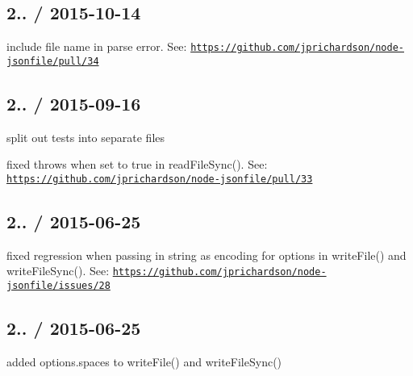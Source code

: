 \subsection*{2.. / 2015-\/10-\/14 }


\begin{DoxyItemize}
\item include file name in parse error. See\+: \href{https://github.com/jprichardson/node-jsonfile/pull/34}{\tt https\+://github.\+com/jprichardson/node-\/jsonfile/pull/34}
\end{DoxyItemize}

\subsection*{2.. / 2015-\/09-\/16 }


\begin{DoxyItemize}
\item split out tests into separate files
\item fixed {\ttfamily throws} when set to {\ttfamily true} in {\ttfamily read\+File\+Sync()}. See\+: \href{https://github.com/jprichardson/node-jsonfile/pull/33}{\tt https\+://github.\+com/jprichardson/node-\/jsonfile/pull/33}
\end{DoxyItemize}

\subsection*{2.. / 2015-\/06-\/25 }


\begin{DoxyItemize}
\item fixed regression when passing in string as encoding for options in {\ttfamily write\+File()} and {\ttfamily write\+File\+Sync()}. See\+: \href{https://github.com/jprichardson/node-jsonfile/issues/28}{\tt https\+://github.\+com/jprichardson/node-\/jsonfile/issues/28}
\end{DoxyItemize}

\subsection*{2.. / 2015-\/06-\/25 }


\begin{DoxyItemize}
\item added {\ttfamily options.\+spaces} to {\ttfamily write\+File()} and {\ttfamily write\+File\+Sync()}
\end{DoxyItemize}

